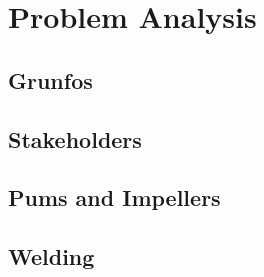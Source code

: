 \section{Problem Analysis}
\subsection{Grunfos}
\begin{frame}

\end{frame}






\subsection{Stakeholders}
\begin{frame}

\end{frame}




\subsection{Pums and Impellers}
\begin{frame}

\end{frame}


\subsection{Welding}
\begin{frame}

\end{frame}










